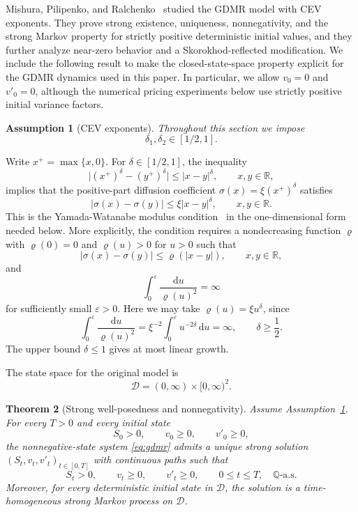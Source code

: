\documentclass[pdflatex,sn-mathphys-num]{sn-jnl}
\theoremstyle{thmstyleone}%
\newtheorem{theorem}{Theorem}[section]
\theoremstyle{thmstylethree}%
\newtheorem{assumption}[theorem]{Assumption}
\theoremstyle{thmstyletwo}%
\newcommand{\dd}{\mathrm d}
\newcommand{\Q}{\mathbb Q}
\newcommand{\R}{\mathbb R}
\begin{document}
Mishura, Pilipenko, and Ralchenko~\cite{mishura2025gatheral} studied the GDMR model with CEV exponents. They prove strong existence, uniqueness, nonnegativity, and the strong Markov property for strictly positive deterministic initial values, and they further analyze near-zero behavior and a Skorokhod-reflected modification. We include the following result to make the closed-state-space property explicit for the GDMR dynamics used in this paper. In particular, we allow $v_0=0$ and $v'_0=0$, although the numerical pricing experiments below use strictly positive initial variance factors.

\begin{assumption}[CEV exponents]\label{ass:delta-range}
Throughout this section we impose
$$
\delta_1,\delta_2\in[1/2,1].
$$
\end{assumption}

Write $x^+=\max\{x,0\}$. For $\delta\in[1/2,1]$, the inequality
$$
\bigl|(x^+)^\delta-(y^+)^\delta\bigr|
\le |x-y|^\delta,\qquad x,y\in\R,
$$
implies that the positive-part diffusion coefficient
$\sigma(x)=\xi(x^+)^\delta$ satisfies
$$
|\sigma(x)-\sigma(y)|
\le \xi |x-y|^\delta,\qquad x,y\in\R.
$$
This is the Yamada-Watanabe modulus condition~\cite{yamada1971uniqueness} in
the one-dimensional form needed below. More explicitly, the condition requires a
nondecreasing function $\varrho$ with $\varrho(0)=0$ and $\varrho(u)>0$ for
$u>0$ such that
$$
|\sigma(x)-\sigma(y)|\le \varrho(|x-y|),\qquad x,y\in\R,
$$
and
$$
\int_0^\varepsilon \frac{\dd u}{\varrho(u)^2}
=
\infty
$$
for sufficiently small $\varepsilon>0$. Here we may take
$\varrho(u)=\xi u^\delta$, since
$$
\int_0^\varepsilon \frac{\dd u}{\varrho(u)^2}
=
\xi^{-2}\int_0^\varepsilon u^{-2\delta}\,\dd u
=
\infty,\qquad \delta\ge\frac12.
$$
The upper bound $\delta\le1$ gives at most linear growth.

The state space for the original model is
$$
\mathcal D=(0,\infty)\times[0,\infty)^2.
$$

\begin{theorem}[Strong well-posedness and nonnegativity]\label{thm:wellposed}
Assume Assumption~\ref{ass:delta-range}. For every $T>0$ and every initial
state
$$
S_0>0,\qquad v_0\ge0,\qquad v'_0\ge0,
$$
the nonnegative-state system \eqref{eq:gdmr} admits a unique strong solution
$(S_t,v_t,v'_t)_{t\in[0,T]}$ with continuous paths such that
$$
S_t>0,\qquad v_t\ge0,\qquad v'_t\ge0,\qquad
0\le t\le T,\quad \Q\text{-a.s.}
$$
Moreover, for every deterministic initial state in $\mathcal D$, the solution
is a time-homogeneous strong Markov process on $\mathcal D$.
\end{theorem}
\end{document}
